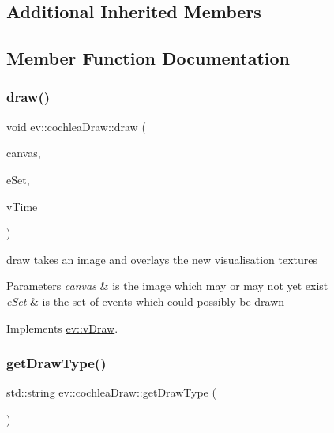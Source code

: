 \subsection*{Additional Inherited Members}


\subsection{Member Function Documentation}
\mbox{\label{classev_1_1cochleaDraw_a2b06c53991065506fcdaa9afec8282af}} 
\subsubsection{\texorpdfstring{draw()}{draw()}}
{\footnotesize\ttfamily void ev\+::cochlea\+Draw\+::draw (\begin{DoxyParamCaption}\item[{cv\+::\+Mat \&}]{canvas,  }\item[{const ev\+::v\+Queue \&}]{e\+Set,  }\item[{int}]{v\+Time }\end{DoxyParamCaption})\hspace{0.3cm}{\ttfamily [virtual]}}



draw takes an image and overlays the new visualisation textures 


\begin{DoxyParams}{Parameters}
{\em canvas} & is the image which may or may not yet exist \\
\hline
{\em e\+Set} & is the set of events which could possibly be drawn \\
\hline
\end{DoxyParams}


Implements \hyperlink{classev_1_1vDraw_af1eee5dcdf3b4cfee6a3024e5cd706f8}{ev\+::v\+Draw}.

\mbox{\label{classev_1_1cochleaDraw_a722aac2b6c1af1f6691721beb8a25325}} 
\subsubsection{\texorpdfstring{get\+Draw\+Type()}{getDrawType()}}
{\footnotesize\ttfamily std\+::string ev\+::cochlea\+Draw\+::get\+Draw\+Type (\begin{DoxyParamCaption}{ }\end{DoxyParamCaption})\hspace{0.3cm}{\ttfamily [virtual]}}



